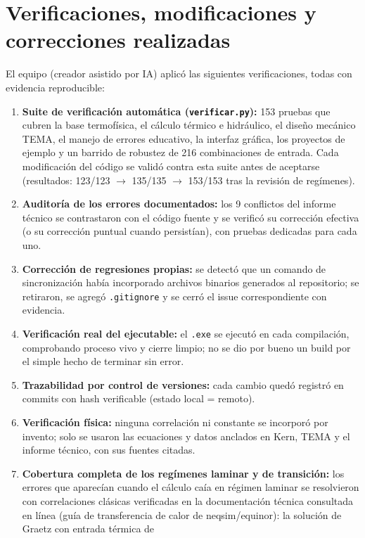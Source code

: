\documentclass[11pt,a4paper]{article}
\begin{document}
\section{Verificaciones, modificaciones y correcciones realizadas}

El equipo (creador asistido por IA) aplicó las siguientes verificaciones,
todas con evidencia reproducible:

\begin{enumerate}
\item \textbf{Suite de verificación automática (\texttt{verificar.py}):}
153 pruebas que cubren la base termofísica, el cálculo térmico e hidráulico,
el diseño mecánico TEMA, el manejo de errores educativo, la interfaz
gráfica, los proyectos de ejemplo y un barrido de robustez de 216
combinaciones de entrada. Cada modificación del código se validó contra
esta suite antes de aceptarse (resultados: 123/123 $\rightarrow$ 135/135
$\rightarrow$ 153/153 tras la revisión de regímenes).
\item \textbf{Auditoría de los errores documentados:} los 9 conflictos del
informe técnico se contrastaron con el código fuente y se verificó su
corrección efectiva (o su corrección puntual cuando persistían), con
pruebas dedicadas para cada uno.
\item \textbf{Corrección de regresiones propias:} se detectó que un comando
de sincronización había incorporado archivos binarios generados al
repositorio; se retiraron, se agregó \texttt{.gitignore} y se cerró el
issue correspondiente con evidencia.
\item \textbf{Verificación real del ejecutable:} el \texttt{.exe} se
ejecutó en cada compilación, comprobando proceso vivo y cierre limpio; no
se dio por bueno un build por el simple hecho de terminar sin error.
\item \textbf{Trazabilidad por control de versiones:} cada cambio quedó
registró en commits con hash verificable (estado local = remoto).
\item \textbf{Verificación física:} ninguna correlación ni constante se
incorporó por invento; solo se usaron las ecuaciones y datos anclados en
Kern, TEMA y el informe técnico, con sus fuentes citadas.
\item \textbf{Cobertura completa de los regímenes laminar y de transición:}
los errores que aparecían cuando el cálculo caía en régimen laminar se
resolvieron con correlaciones clásicas verificadas en la documentación
técnica consultada en línea (guía de transferencia de calor de
neqsim/equinor): la solución de Graetz con entrada térmica de

\end{enumerate}
\end{document}
